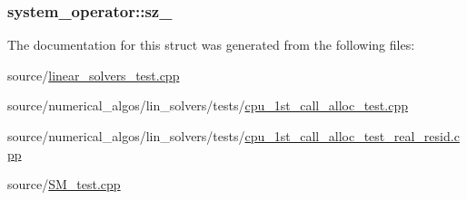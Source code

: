\hypertarget{structsystem__operator_afd5792e0496aa8cb5856c55ed2fe6bef}{
\subsubsection[{sz\-\_\-}]{ system\-\_\-operator\-::sz\-\_\-}}\label{structsystem__operator_afd5792e0496aa8cb5856c55ed2fe6bef}


The documentation for this struct was generated from the following files\-:\begin{DoxyCompactItemize}
\item 
source/\hyperlink{linear__solvers__test_8cpp}{linear\-\_\-solvers\-\_\-test.\-cpp}\item 
source/numerical\-\_\-algos/lin\-\_\-solvers/tests/\hyperlink{cpu__1st__call__alloc__test_8cpp}{cpu\-\_\-1st\-\_\-call\-\_\-alloc\-\_\-test.\-cpp}\item 
source/numerical\-\_\-algos/lin\-\_\-solvers/tests/\hyperlink{cpu__1st__call__alloc__test__real__resid_8cpp}{cpu\-\_\-1st\-\_\-call\-\_\-alloc\-\_\-test\-\_\-real\-\_\-resid.\-cpp}\item 
source/\hyperlink{SM__test_8cpp}{S\-M\-\_\-test.\-cpp}\end{DoxyCompactItemize}
